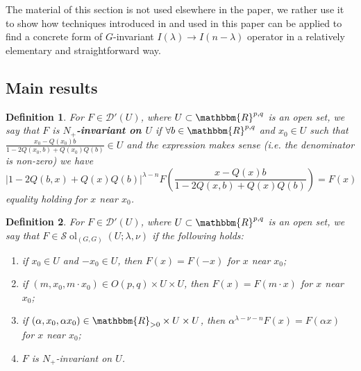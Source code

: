 \documentclass{article}
\newcommand{\tmop}[1]{\ensuremath{\operatorname{#1}}}
\newcommand{\tmtextbf}[1]{{\bfseries{#1}}}
\newtheorem{definition}{Definition}
\numberwithin{definition}{section}
\numberwithin{lemma}{section}
\numberwithin{proposition}{section}
{\theorembodyfont{\rmfamily}\newtheorem{remark}{Remark}
\numberwithin{remark}{section}
}
\newcommand{\D}{\mathcal{D}} \newcommand{\supp}{supp}
\begin{document}
The material of this section is not used elsewhere in the paper, we rather use
it to show how techniques introduced in {\cite{kobayashi2015symmetry}} and
used in this paper can be applied to find a concrete form of $G$-invariant $I
( \lambda) \rightarrow I ( n - \lambda)$ operator in a relatively elementary
and straightforward way.

\subsection{Main results}

\begin{definition}
  \label{knappstein:def-n+invar}For $F \in \D' (U)$, where $U \subset
  \mathbbm{R}^{p, q}$ is an open set, we say that $F$ is
  \tmtextbf{$N_+$-invariant on $U$} if $\forall b \in \mathbbm{R}^{p, q}$ and
  $x_0 \in U$ such that $\frac{x_0 - Q (x_0) b}{1 - 2 Q (x_0, b) + Q (x_0) Q
  (b)} \in U$ and the expression makes sense (i.e. the denominator is
  non-zero) we have
  \begin{equation}
    \label{knappstein:eq-Nequiv} | 1 - 2 Q (b, x) + Q (x) Q (b) |^{\lambda -
    n} F \left( \frac{x - Q (x) b}{1 - 2 Q (x, b) + Q (x) Q (b)} \right) = F
    (x)
  \end{equation}
  equality holding for $x$ near $x_0$.
\end{definition}

\begin{definition}
  \label{knappstein:def-sol}For $F \in \D' (U)$, where $U \subset
  \mathbbm{R}^{p, q}$ is an open set, we say that $F \in \mathcal{S}
  \tmop{ol}_{( G, G)} ( U ; \lambda, \nu)$ if the following holds:
  \begin{enumerate}
    \item if $x_0 \in U$ and $- x_0 \in U$, then $F (x) = F (- x)$ for $x$
    near $x_0$;
    
    \item if $(m, x_0, m \cdot x_0) \in O ( p, q) \times U \times U$, then $F
    (x) = F (m \cdot x)$ for $x$ near $x_0$;
    
    \item if $(\alpha, x_0, \alpha x_0) \in \mathbbm{R}_{> 0} \times U \times
    U$, then $\alpha^{\lambda - \nu - n} F (x) = F (\alpha x)$ for $x$ near
    $x_0$;
    
    \item $F$ is $N_+$-invariant on $U$.
  \end{enumerate}
\end{definition}
\end{document}
